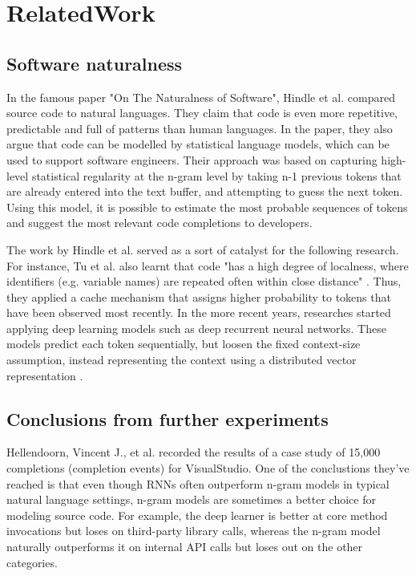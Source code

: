 \chapter{RelatedWork}
\label{chap:RelatedWork}

\section{Software naturalness}
In the famous paper "On The Naturalness of Software", Hindle et al. \cite{Hind12a} compared source code
to natural languages. They claim that code is even more repetitive, predictable and full of
patterns than human languages. In the paper, they also argue that code can be modelled by
statistical language models, which can be used to support software engineers. Their approach
was based on capturing high-level statistical regularity at the n-gram level by taking n-1
previous tokens that are already entered into the text buffer, and attempting to guess the
next token. Using this model, it is possible to estimate the most probable sequences of tokens
and suggest the most relevant code completions to developers.

The work by Hindle et al. \cite{Hind12a} served as a sort of catalyst for the following research. For
instance, Tu et al. \cite{Tu14a} also learnt that code "has a high degree of localness, where identifiers
(e.g. variable names) are repeated often within close distance" \cite{Alla18a}. Thus, they applied a cache
mechanism that assigns higher probability to tokens that have been observed most recently. In the
more recent years, researches started applying deep learning models such as deep recurrent
neural networks. These models predict each token sequentially, but loosen the fixed context-size
assumption, instead representing the context using a distributed vector representation \cite{Alla18a}.

\section{Conclusions from further experiments}
Hellendoorn, Vincent J., et al. \cite{Hell19a} recorded the results of a case study of 15,000 completions
(completion events) for VisualStudio. One of the conclustions they've reached is that even though
RNNs often outperform n-gram models in typical natural language settings, n-gram models are
sometimes a better choice for modeling source code. For example, the deep learner is better at
core method invocations but loses on third-party library calls, whereas the n-gram model
naturally outperforms it on internal API calls but loses out on the other categories.

